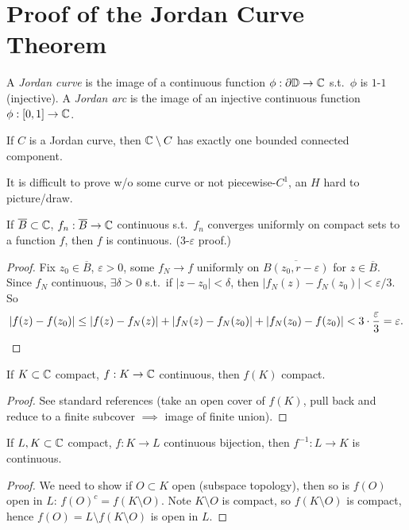 \documentclass[11pt]{article}
\begin{document}
\newpage
\appendix


\section{Proof of the Jordan Curve Theorem}

\begin{definition}
A \emph{Jordan curve} is the image of a continuous function $\phi:\partial{\mathbb{D}}\to{\mathbb{C}}$ s.t.\ $\phi$ is $1$-$1$ (injective). A \emph{Jordan arc} is the image of an injective continuous function $\phi:[0,1]\to{\mathbb{C}}$.
\end{definition}

\begin{theorem}
If $C$ is a Jordan curve, then ${\mathbb{C}}\setminus C$ has exactly one bounded connected component.
\end{theorem}

\begin{remark}
It is difficult to prove w/o some curve or not piecewise-$C^1$, an $H$ hard to picture/draw.
\end{remark}

\begin{theorem}
If $\overline B\subset{\mathbb{C}}$, $f_n:\overline B\to{\mathbb{C}}$ continuous s.t.\ $f_n$ converges uniformly on compact sets to a function $f$, then $f$ is continuous. ($3$-$\varepsilon$ proof.)
\end{theorem}
\begin{proof}
Fix $z_0\in\overline B$, $\varepsilon>0$, some $f_N \to f$ uniformly on $\overline{B(z_0,r-\varepsilon)}$ for $z\in\overline B$. Since $f_N$ continuous, $\exists\delta>0$ s.t.\ if $|z-z_0|<\delta$, then $|f_N(z)-f_N(z_0)|<\varepsilon/3$. So
\[
|f(z)-f(z_0)| \le |f(z)-f_N(z)| + |f_N(z)-f_N(z_0)| + |f_N(z_0)-f(z_0)| < 3\cdot\frac\varepsilon3 = \varepsilon. \qedhere
\]
\end{proof}

\begin{theorem}
If $K\subset{\mathbb{C}}$ compact, $f:K\to{\mathbb{C}}$ continuous, then $f(K)$ compact.
\end{theorem}
\begin{proof}
See standard references (take an open cover of $f(K)$, pull back and reduce to a finite subcover $\implies$ image of finite union).
\end{proof}

\begin{corollary}
If $L,K\subset{\mathbb{C}}$ compact, $f:K\to L$ continuous bijection, then $f^{-1}:L\to K$ is continuous.
\end{corollary}
\begin{proof}
We need to show if $O\subset K$ open (subspace topology), then so is $f(O)$ open in $L$: $f(O)^c = f(K\setminus O)$. Note $K\setminus O$ is compact, so $f(K\setminus O)$ is compact, hence $f(O) = L\setminus f(K\setminus O)$ is open in $L$.
\end{proof}
\end{document}
